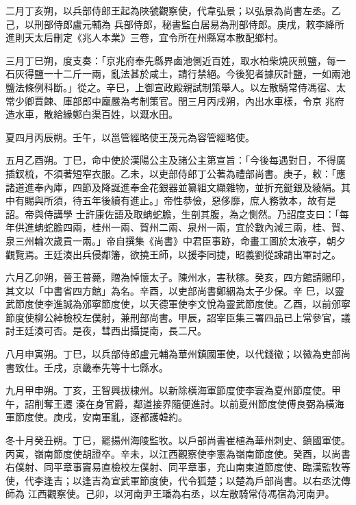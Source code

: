 \begin{pinyinscope}
 二月丁亥朔，以兵部侍郎王起為陜虢觀察使，代韋弘景；以弘景為尚書左丞。乙己，以刑部侍郎盧元輔為
 兵部侍郎，秘書監白居易為刑部侍郎。庚戌，敕李絳所進則天太后刪定《兆人本業》三卷，宜令所在州縣寫本散配鄉村。



 三月丁巳朔，度支奏：「京兆府奉先縣界鹵池側近百姓，取水柏柴燒灰煎鹽，每一石灰得鹽一十二斤一兩，亂法甚於咸土，請行禁絕。今後犯者據灰計鹽，一如兩池鹽法條例科斷。」從之。辛巳，上御宣政殿親試制策舉人。以左散騎常侍馮宿、太常少卿賈餗、庫部郎中龐嚴為考制策官。閏三月丙戌朔，內出水車樣，令京
 兆府造水車，散給緣鄭白渠百姓，以溉水田。



 夏四月丙辰朔。壬午，以邕管經略使王茂元為容管經略使。



 五月乙酉朔。丁巳，命中使於漢陽公主及諸公主第宣旨：「今後每遇對日，不得廣插釵梳，不須著短窄衣服。乙未，以吏部侍郎丁公著為禮部尚書。庚子，敕：「應諸道進奉內庫，四節及降誕進奉金花銀器並纂組文纈雜物，並折充鋌銀及綾絹。其中有賜與所須，待五年後續有進止。」帝性恭儉，惡侈靡，庶人務敦本，故有是詔。帝與侍講學
 士許康佐語及取蚺蛇膽，生剖其腹，為之惻然。乃詔度支曰：「每年供進蚺蛇膽四兩，桂州一兩、賀州二兩、泉州一兩，宜於數內減三兩，桂、賀、泉三州輪次歲貢一兩。」帝自撰集《尚書》中君臣事跡，命畫工圖於太液亭，朝夕觀覽焉。王廷湊出兵侵鄰籓，欲撓王師，以援李同捷，昭義劉從諫請出軍討之。



 六月乙卯朔，晉王普薨，贈為悼懷太子。陳州水，害秋稼。癸亥，四方館請賜印，其文以「中書省四方館」為名。辛酉，以吏部尚書鄭絪為太子少保。辛
 巳，以靈武節度使李進誠為邠寧節度使，以天德軍使李文悅為靈武節度使。乙酉，以前邠寧節度使柳公綽檢校左僕射，兼刑部尚書。甲辰，詔宰臣集三署四品已上常參官，議討王廷湊可否。是夜，彗西出攝提南，長二尺。



 八月申寅朔。丁巳，以兵部侍郎盧元輔為華州鎮國軍使，以代錢徽；以徽為吏部尚書致仕。壬戌，京畿奉先等十七縣水。



 九月甲申朔。丁亥，王智興拔棣州。以新除橫海軍節度使李寰為夏州節度使。甲午，詔削奪王遷
 湊在身官爵，鄰道接界隨便進討。以前夏州節度使傅良弼為橫海軍節度使。庚戌，安南軍亂，逐都護韓約。



 冬十月癸丑朔。丁巳，罷揚州海陵監牧。以戶部尚書崔植為華州刺史、鎮國軍使。丙寅，嶺南節度使胡證卒。辛未，以江西觀察使李憲為嶺南節度使。癸酉，以尚書右僕射、同平章事竇易直檢校左僕射、同平章事，充山南東道節度使、臨漢監牧等使，代李逢吉；以逢吉為宣武軍節度使，代令狐楚；以楚為戶部尚書。以右丞沈傳師為
 江西觀察使。己卯，以河南尹王璠為右丞，以左散騎常侍馮宿為河南尹。




\end{pinyinscope}
